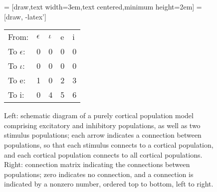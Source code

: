 \documentclass[12pt,a4paper]{article}
\begin{document}
\begin{figure}[h!]\begin{center}
 = [draw,text width=3em,text centered,minimum height=2em]
 = [draw, -latex']
    
\hspace{3cm}\begin{tabular}{ l l l l l }
	From:& $\epsilon$ & $\iota$ & e & i \\
	To $\epsilon$:& 0 & 0 & 0 & 0 \\
	To $\iota$:& 0 & 0 & 0 & 0 \\
	To e:& 1 & 0 & 2 & 3 \\
	To i:& 0 & 4 & 5 & 6
\end{tabular}
\caption{Left: schematic diagram of a purely cortical population model comprising excitatory and inhibitory populations, as well as two stimulus populations; each arrow indicates a connection between populations, so that each stimulus connects to a cortical population, and each cortical population connects to all cortical populations. Right: connection matrix indicating the connections between populations; zero indicates no connection, and a connection is indicated by a nonzero number, ordered top to bottom, left to right.}
\label{fig:pop}\end{center}\end{figure}
\end{document}
